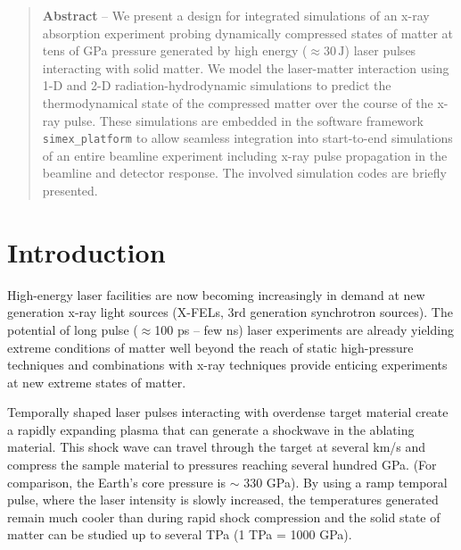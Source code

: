 \documentclass[10pt]{scrartcl}
\begin{document}
\tableofcontents

\begin{abstract}
  \noindent%
  \textbf{Abstract} -- We present a design for integrated simulations of an x-ray absorption
  experiment probing dynamically compressed states of matter at tens of GPa pressure generated by
  high energy ($\approx 30\,\text{J}$) laser pulses interacting with solid matter.
  We model the laser-matter interaction using 1-D and 2-D radiation-hydrodynamic simulations to predict
  the thermodynamical state of the compressed matter over the course of the x-ray pulse. These simulations
  are embedded in the software framework \texttt{simex\_platform} to allow seamless integration into
  start-to-end simulations of an entire beamline experiment including x-ray pulse propagation in the beamline and
  detector response. The involved simulation codes are briefly presented.
\end{abstract}
%
\section{Introduction}
High-energy laser facilities are now becoming increasingly in demand at new
generation x-ray light sources (X-FELs, 3rd generation synchrotron sources). The
potential of long pulse ($\approx$100 ps -- few ns) laser experiments are already yielding extreme
conditions of matter well beyond the reach of static high-pressure techniques
and combinations with x-ray techniques provide enticing experiments at new
extreme states of matter.

Temporally shaped laser pulses interacting with overdense target material create
a rapidly expanding plasma that can generate a shockwave in the ablating
material. This shock wave can travel through the target at several km/s and
compress the sample material to pressures reaching several hundred GPa. (For
comparison, the Earth's core pressure is $\sim$ 330 GPa). By using a ramp
temporal pulse, where the laser intensity is slowly increased, the temperatures
generated remain much cooler than during rapid shock compression and the solid
state of matter can be studied up to several TPa (1 TPa = 1000 GPa).
\end{document}
